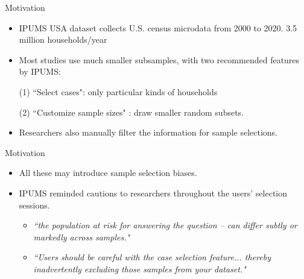 \documentclass[beamer, t]{beamer}
\begin{document}
\begin{frame}{Motivation}
	
	\begin{itemize}
		
		\item    IPUMS USA dataset   collects   U.S. census microdata from 2000 to 2020.  3.5 million households/year
		
		\medskip
		\item 
		Most studies   use much smaller subsamples, with two recommended features by IPUMS:
		
		(1)  ``Select cases":   only particular kinds of  households
		
		(2) ``Customize sample sizes" :  draw smaller random subsets. 
		
		\medskip
		
		\item Researchers also  manually filter the information for sample selections. 
		
	\end{itemize}
\end{frame}


\begin{frame}{Motivation}
	
	\begin{itemize}
		
		
		\item All these may introduce sample selection biases.
		
		\item IPUMS reminded cautions to researchers throughout the users' selection sessions.
		
		\begin{itemize}
			\item  \textit{``the population at risk for answering the question -- can differ subtly or markedly across samples."}
			
			\medskip
			
			\item \textit{``Users should be careful with the case selection feature... thereby inadvertently excluding those samples from your dataset."}
		\end{itemize}
	
		
	\end{itemize}
\end{frame}
\end{document}
